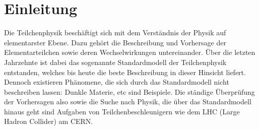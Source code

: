 \chapter{Einleitung}

Die Teilchenphysik beschäftigt sich mit dem Verständnis der Physik auf elementarster Ebene. Dazu gehört die Beschreibung und Vorhersage der Elementarteilchen sowie deren Wechselwirkungen untereinander. Über die letzten Jahrzehnte ist dabei das sogenannte Standardmodell der Teilchenphysik entstanden, welches bis heute die beste Beschreibung in dieser Hinsicht liefert. Dennoch existieren Phänomene, die sich durch das Standardmodell nicht beschreiben lassen: Dunkle Materie, etc sind Beispiele. Die ständige Überprüfung der Vorhersagen also sowie die Suche nach Physik, die über das Standardmodell hinaus geht sind Aufgaben von Teilchenbeschleunigern wie dem LHC (Large Hadron Collider) am CERN. 
